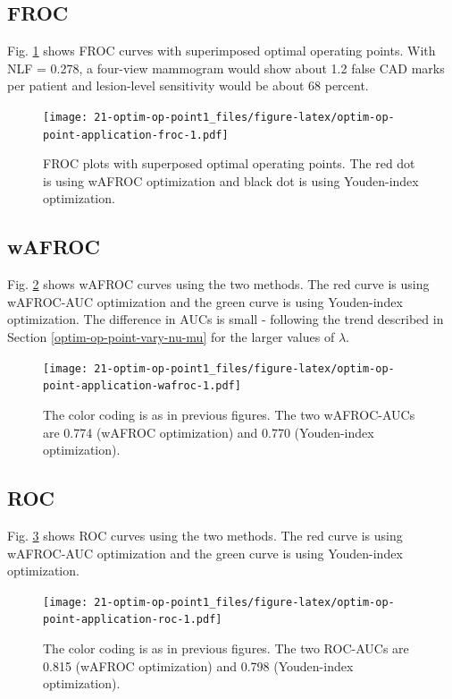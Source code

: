 \documentclass[
]{book}
\begin{document}
\hypertarget{froc-2}{%
\subsection{FROC}\label{froc-2}}

Fig. \ref{fig:optim-op-point-application-froc} shows FROC curves with superimposed optimal operating points. With NLF = 0.278, a four-view mammogram would show about 1.2 false CAD marks per patient and lesion-level sensitivity would be about 68 percent.

\begin{figure}
\centering
\texttt{[image: 21-optim-op-point1\_files/figure-latex/optim-op-point-application-froc-1.pdf]}
\caption{\label{fig:optim-op-point-application-froc}FROC plots with superposed optimal operating points. The red dot is using wAFROC optimization and black dot is using Youden-index optimization.}
\end{figure}

\hypertarget{wafroc-2}{%
\subsection{wAFROC}\label{wafroc-2}}

Fig. \ref{fig:optim-op-point-application-wafroc} shows wAFROC curves using the two methods. The red curve is using wAFROC-AUC optimization and the green curve is using Youden-index optimization. The difference in AUCs is small - following the trend described in Section \ref{optim-op-point-vary-nu-mu} for the larger values of \(\lambda\).

\begin{figure}
\centering
\texttt{[image: 21-optim-op-point1\_files/figure-latex/optim-op-point-application-wafroc-1.pdf]}
\caption{\label{fig:optim-op-point-application-wafroc}The color coding is as in previous figures. The two wAFROC-AUCs are 0.774 (wAFROC optimization) and 0.770 (Youden-index optimization).}
\end{figure}

\hypertarget{roc-2}{%
\subsection{ROC}\label{roc-2}}

Fig. \ref{fig:optim-op-point-application-roc} shows ROC curves using the two methods. The red curve is using wAFROC-AUC optimization and the green curve is using Youden-index optimization.

\begin{figure}
\centering
\texttt{[image: 21-optim-op-point1\_files/figure-latex/optim-op-point-application-roc-1.pdf]}
\caption{\label{fig:optim-op-point-application-roc}The color coding is as in previous figures. The two ROC-AUCs are 0.815 (wAFROC optimization) and 0.798 (Youden-index optimization).}
\end{figure}
\end{document}
